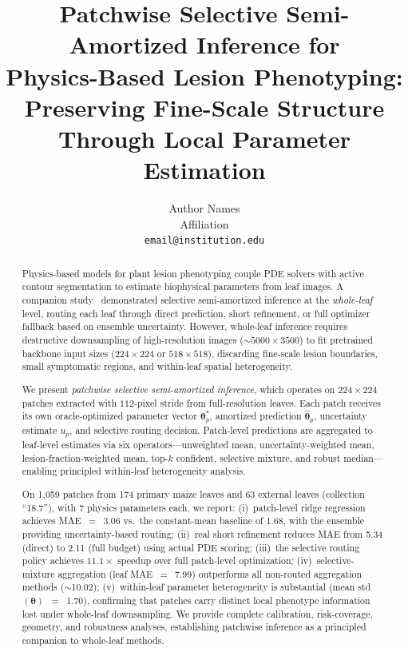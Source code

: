 \documentclass[11pt,a4paper]{article}
\title{Patchwise Selective Semi-Amortized Inference for\\
Physics-Based Lesion Phenotyping:\\
Preserving Fine-Scale Structure Through Local Parameter Estimation}
\author{
  Author Names\\
  Affiliation\\
  \texttt{email@institution.edu}
}
\date{}
\newcommand{\btheta}{\boldsymbol{\theta}}
\begin{document}
\maketitle

\begin{abstract}
Physics-based models for plant lesion phenotyping couple PDE solvers
with active contour segmentation to estimate biophysical parameters
from leaf images.
A companion study~\cite{amos2023tutorial} demonstrated selective semi-amortized
inference at the \emph{whole-leaf} level, routing each leaf through
direct prediction, short refinement, or full optimizer fallback based
on ensemble uncertainty.
However, whole-leaf inference requires destructive downsampling of
high-resolution images (${\sim}5000{\times}3500$) to fit pretrained
backbone input sizes ($224{\times}224$ or $518{\times}518$),
discarding fine-scale lesion boundaries, small symptomatic regions,
and within-leaf spatial heterogeneity.

We present \emph{patchwise selective semi-amortized inference},
which operates on $224{\times}224$ patches extracted with
$112$-pixel stride from full-resolution leaves.
Each patch receives its own oracle-optimized parameter vector $\btheta^*_p$,
amortized prediction $\hat{\btheta}_p$, uncertainty estimate $u_p$,
and selective routing decision.
Patch-level predictions are aggregated to leaf-level estimates via
six operators---unweighted mean, uncertainty-weighted mean,
lesion-fraction-weighted mean, top-$k$ confident, selective mixture,
and robust median---enabling principled within-leaf heterogeneity analysis.

On 1{,}059 patches from 174 primary maize leaves and 63 external leaves
(collection ``18.7''), with 7 physics parameters each,
we report:
(i)~patch-level ridge regression achieves MAE~$=$~3.06 vs.\ the constant-mean
baseline of 1.68, with the ensemble providing uncertainty-based routing;
(ii)~real short refinement reduces MAE from 5.34 (direct) to 2.11 (full budget)
using actual PDE scoring;
(iii)~the selective routing policy achieves $11.1{\times}$ speedup over full
patch-level optimization;
(iv)~selective-mixture aggregation (leaf MAE~$=$~7.99) outperforms all
non-routed aggregation methods (${\sim}$10.02);
(v)~within-leaf parameter heterogeneity is substantial (mean std$(\btheta)$~$=$~1.70),
confirming that patches carry distinct local phenotype information
lost under whole-leaf downsampling.
We provide complete calibration, risk-coverage, geometry, and
robustness analyses, establishing patchwise inference as a principled
companion to whole-leaf methods.
\end{abstract}
\end{document}
